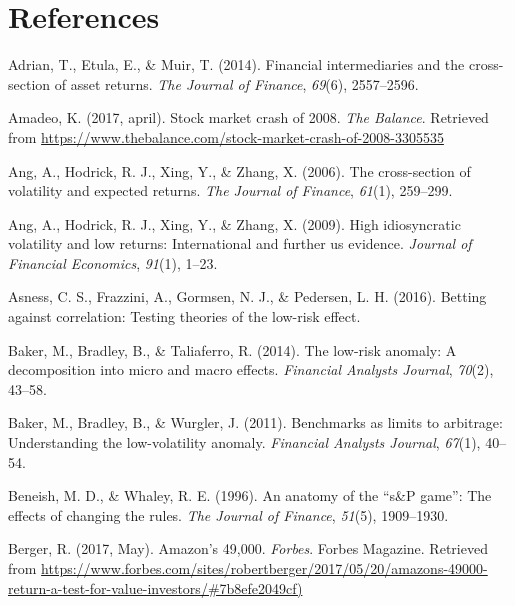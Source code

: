 \documentclass[12pt,twoside]{reedthesis}
\theoremstyle{definition}
\theoremstyle{definition}
\theoremstyle{definition}
\theoremstyle{remark}
\begin{document}
\backmatter

\chapter*{References}\label{references}


\noindent

\setlength{\parindent}{-0.20in} \setlength{\leftskip}{0.20in}
\setlength{\parskip}{8pt}

\hypertarget{refs}{}
\hypertarget{ref-adrian2014}{}
Adrian, T., Etula, E., \& Muir, T. (2014). Financial intermediaries and
the cross-section of asset returns. \emph{The Journal of Finance},
\emph{69}(6), 2557--2596.

\hypertarget{ref-amadeo2017}{}
Amadeo, K. (2017, april). Stock market crash of 2008. \emph{The
Balance}. Retrieved from
\url{https://www.thebalance.com/stock-market-crash-of-2008-3305535}

\hypertarget{ref-ang2006}{}
Ang, A., Hodrick, R. J., Xing, Y., \& Zhang, X. (2006). The
cross-section of volatility and expected returns. \emph{The Journal of
Finance}, \emph{61}(1), 259--299.

\hypertarget{ref-ang2009}{}
Ang, A., Hodrick, R. J., Xing, Y., \& Zhang, X. (2009). High
idiosyncratic volatility and low returns: International and further us
evidence. \emph{Journal of Financial Economics}, \emph{91}(1), 1--23.

\hypertarget{ref-asness2016}{}
Asness, C. S., Frazzini, A., Gormsen, N. J., \& Pedersen, L. H. (2016).
Betting against correlation: Testing theories of the low-risk effect.

\hypertarget{ref-baker2014}{}
Baker, M., Bradley, B., \& Taliaferro, R. (2014). The low-risk anomaly:
A decomposition into micro and macro effects. \emph{Financial Analysts
Journal}, \emph{70}(2), 43--58.

\hypertarget{ref-baker2011}{}
Baker, M., Bradley, B., \& Wurgler, J. (2011). Benchmarks as limits to
arbitrage: Understanding the low-volatility anomaly. \emph{Financial
Analysts Journal}, \emph{67}(1), 40--54.

\hypertarget{ref-beneish1996}{}
Beneish, M. D., \& Whaley, R. E. (1996). An anatomy of the ``s\&P
game'': The effects of changing the rules. \emph{The Journal of
Finance}, \emph{51}(5), 1909--1930.

\hypertarget{ref-berger2017}{}
Berger, R. (2017, May). Amazon's 49,000. \emph{Forbes}. Forbes Magazine.
Retrieved from
\url{https://www.forbes.com/sites/robertberger/2017/05/20/amazons-49000-return-a-test-for-value-investors/\#7b8efe2049cf)}
\end{document}
